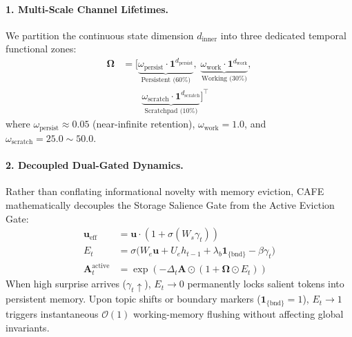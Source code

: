 \paragraph{1. Multi-Scale Channel Lifetimes.}
We partition the continuous state dimension $d_{\mathrm{inner}}$ into three dedicated temporal functional zones:
\begin{equation}
\begin{split}
    \boldsymbol{\Omega} &= \big[ \underbrace{\omega_{\mathrm{persist}} \cdot \mathbf{1}^{d_{\mathrm{persist}}}}_{\text{Persistent (60\%)}}, \; \underbrace{\omega_{\mathrm{work}} \cdot \mathbf{1}^{d_{\mathrm{work}}}}_{\text{Working (30\%)}}, \\
    &\qquad \underbrace{\omega_{\mathrm{scratch}} \cdot \mathbf{1}^{d_{\mathrm{scratch}}}}_{\text{Scratchpad (10\%)}} \big]^\top
\end{split}
\end{equation}
where $\omega_{\mathrm{persist}} \approx 0.05$ (near-infinite retention), $\omega_{\mathrm{work}} = 1.0$, and $\omega_{\mathrm{scratch}} = 25.0 \sim 50.0$.

\paragraph{2. Decoupled Dual-Gated Dynamics.}
Rather than conflating informational novelty with memory eviction, CAFE mathematically decouples the Storage Salience Gate from the Active Eviction Gate:
\begin{align}
    \mathbf{u}_{\mathrm{eff}} &= \mathbf{u} \cdot \left(1 + \sigma(W_s \gamma_t)\right) \\
    E_t &= \sigma\Big( W_e \mathbf{u} + U_e h_{t-1} + \lambda_{b} \mathbf{1}_{\{\mathrm{bnd}\}} - \beta \gamma_t \Big) \\
    \mathbf{A}_t^{\mathrm{active}} &= \exp\left( -\Delta_t \mathbf{A} \odot (1 + \boldsymbol{\Omega} \odot E_t) \right)
\end{align}
When high surprise arrives ($\gamma_t \uparrow$), $E_t \rightarrow 0$ permanently locks salient tokens into persistent memory. Upon topic shifts or boundary markers ($\mathbf{1}_{\{\mathrm{bnd}\}} = 1$), $E_t \rightarrow 1$ triggers instantaneous $\mathcal{O}(1)$ working-memory flushing without affecting global invariants.

